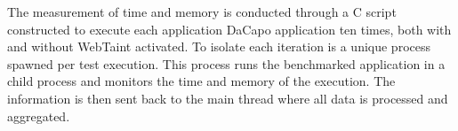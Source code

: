 The measurement of time and memory is conducted through a C script constructed to execute each application DaCapo application ten times, both with and without WebTaint activated. To isolate each iteration is a unique process spawned per test execution. This process runs the benchmarked application in a child process and monitors the time and memory of the execution. The information is then sent back to the main thread where all data is processed and aggregated.  